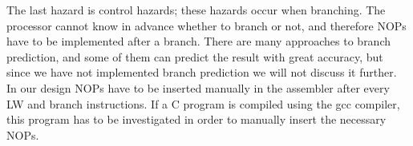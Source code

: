The last hazard is control hazards; these hazards occur when branching. The processor cannot know in advance whether to branch or not, and therefore NOPs have to be implemented after a branch. There are many approaches to branch prediction, and some of them can predict the result with great accuracy, but since we have not implemented branch prediction we will not discuss it further. In our design NOPs have to be inserted manually in the assembler after every LW and branch instructions. If a C program is compiled using the gcc compiler, this program has to be investigated in order to manually insert the necessary NOPs.

